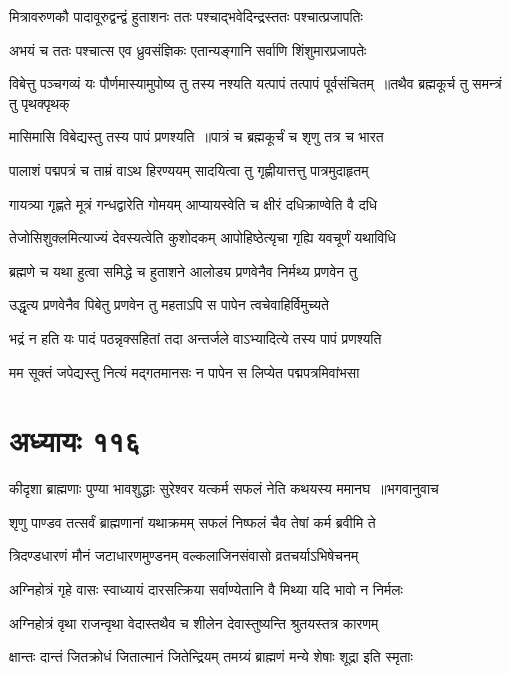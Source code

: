 \twolineshloka
{मित्रावरुणकौ पादावूरुद्वन्द्वं हुताशनः}
{ततः पश्चाद्भवेदिन्द्रस्ततः पश्चात्प्रजापतिः}


\twolineshloka
{अभयं च ततः पश्चात्स एव ध्रुवसंज्ञिकः}
{एतान्यङ्गानि सर्वाणि शिंशुमारप्रजापतेः}


\threelineshloka
{विबेत्तु पञ्चगव्यं यः पौर्णमास्यामुपोष्य तु}
{तस्य नश्यति यत्पापं तत्पापं पूर्वसंचितम् ॥तथैव ब्रह्मकूर्च तु समन्त्रं तु पृथक्पृथक्}
{}


\twolineshloka
{मासिमासि विबेद्यस्तु तस्य पापं प्रणश्यति ॥पात्रं च ब्रह्मकूर्चं च शृणु तत्र च भारत}
{}


\twolineshloka
{पालाशं पद्मपत्रं च ताम्रं वाऽथ हिरण्ययम्}
{सादयित्वा तु गृह्णीयात्तत्तु पात्रमुदाहृतम्}


\twolineshloka
{गायत्र्या गृह्णते मूत्रं गन्धद्वारेति गोमयम्}
{आप्यायस्वेति च क्षीरं दधिक्राण्वेति वै दधि}


\twolineshloka
{तेजोसिशुक्लमित्याज्यं देवस्यत्वेति कुशोदकम्}
{आपोहिष्ठेत्यृचा गृह्यि यवचूर्णं यथाविधि}


\twolineshloka
{ब्रह्मणे च यथा हुत्वा समिद्धे च हुताशने}
{आलोड्य प्रणवेनैव निर्मथ्य प्रणवेन तु}


\twolineshloka
{उद्धृत्य प्रणवेनैव पिबेतु प्रणवेन तु}
{महताऽपि स पापेन त्वचेवाहिर्विमुच्यते}


\twolineshloka
{भद्रं न हति यः पादं पठन्नृक्सहितां तदा}
{अन्तर्जले वाऽभ्यादित्ये तस्य पापं प्रणश्यति}


\twolineshloka
{मम सूक्तं जपेद्यस्तु नित्यं मद्गतमानसः}
{न पापेन स लिप्येत पद्मपत्रमिवांभसा}


\chapter{अध्यायः ११६}
\threelineshloka
{कीदृशा ब्राह्मणाः पुण्या भावशुद्धाः सुरेश्वर}
{यत्कर्म सफलं नेति कथयस्य ममानघ ॥भगवानुवाच}
{}


\twolineshloka
{शृणु पाण्डव तत्सर्वं ब्राह्मणानां यथाक्रमम्}
{सफलं निष्फलं चैव तेषां कर्म ब्रवीमि ते}


\twolineshloka
{त्रिदण्डधारणं मौनं जटाधारणमुण्डनम्}
{वल्कलाजिनसंवासो व्रतचर्याऽभिषेचनम्}


\twolineshloka
{अग्निहोत्रं गृहे वासः स्वाध्यायं दारसत्क्रिया}
{सर्वाण्येतानि वै मिथ्या यदि भावो न निर्मलः}


\twolineshloka
{अग्निहोत्रं वृथा राजन्वृथा वेदास्तथैव च}
{शीलेन देवास्तुष्यन्ति श्रुतयस्तत्र कारणम्}


\twolineshloka
{क्षान्तः दान्तं जितक्रोधं जितात्मानं जितेन्द्रियम्}
{तमग्र्यं ब्राह्मणं मन्ये शेषाः शूद्रा इति स्मृताः}


